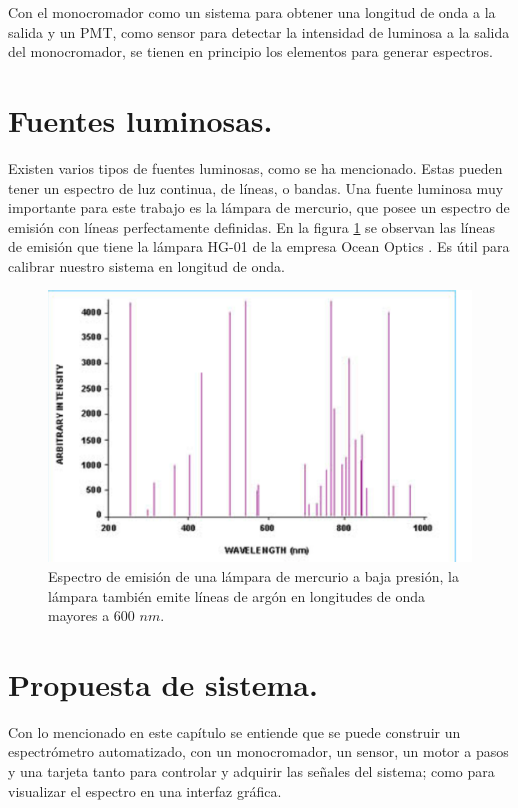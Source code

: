 Con el monocromador como un sistema para obtener una longitud de onda a la salida y un PMT, como sensor para detectar la intensidad de luminosa a la salida del monocromador, se tienen en principio los elementos para generar espectros.


\section{Fuentes luminosas.}
Existen varios tipos de fuentes luminosas, como se ha mencionado. Estas pueden tener un espectro de luz continua, de líneas, o bandas. Una fuente luminosa muy importante para este trabajo es la lámpara de mercurio, que posee un espectro de emisión con líneas perfectamente definidas. En la figura \ref{fig:lamparamercurio} se observan las líneas de emisión que tiene la lámpara HG-01 de la empresa Ocean Optics \cite{Excel2000}. Es útil para calibrar nuestro sistema en longitud de onda. 
\begin{figure}[h]
	\centering
	\includegraphics[width=0.7\linewidth]{Imagenes/lamparaMercurio}
	\caption[Espectro de emisión de una lámpara de mercurio a baja presión.]{Espectro de emisión de una lámpara de mercurio a baja presión, la lámpara también emite líneas de argón en longitudes de onda mayores a 600 $nm$. \cite{Excel2000}}
	\label{fig:lamparamercurio}
\end{figure}
\section{Propuesta de sistema.}
Con lo mencionado en este capítulo se entiende que se puede construir un espectrómetro automatizado, con un monocromador, un sensor, un motor a pasos y una tarjeta tanto para controlar y adquirir las señales del sistema; como para visualizar el espectro en una interfaz gráfica. 
